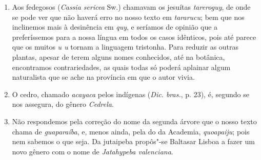 \begin{enumerate}
\item Aos fedegosos (\textit{Cassia sericea} Sw.) chamavam os jesuítas \textit{tareroguy}, de onde se 
pode ver que não haverá erro no nosso texto em \textit{tararucu}; bem que nos inclinemos mais 
à desinência em \textit{quy}, e seríamos de opinião que a preferíssemos para a nossa língua em 
todos os casos idênticos, pois até parece que os muitos \textit{u u} tornam a linguagem 
tristonha. Para reduzir as outras plantas, apesar de terem alguns nomes conhecidos, até 
na botânica, encontramos contrariedades, as quais todas só poderá aplainar algum 
naturalista que se ache na província em que o autor vivia.

\item O cedro, chamado \textit{acayaca} pelos indígenas (\textit{Dic. bras.}, p. 23), é, segundo se nos 
assegura, do gênero \textit{Cedrela}.

\item Não respondemos pela correção do nome da segunda árvore que o nosso texto 
chama de \textit{guaparaíba}, e, menos ainda, pela do da Academia, \textit{quoapaiju}; pois nem 
sabemos o que seja. Da jutaipeba propôs"-se Baltasar Lisboa a fazer um novo gênero 
com o nome de \textit{Jatahypeba valenciana}.


\end{enumerate}
